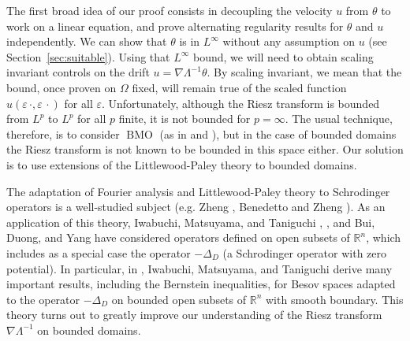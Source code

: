 \documentclass[11pt]{amsart}
\theoremstyle{remark}
\theoremstyle{definition}
\newcommand{\R}{\mathbb{R}}
\newcommand{\eps}{\varepsilon}
\DeclareMathOperator{\BMO}{BMO}
\newcommand{\grad}{\nabla}
\newcommand{\Laplace}{\Delta}
\begin{document}
\vskip0.3cm

The first broad  idea of our proof consists in decoupling the  velocity $u$ from  $\theta$ to work on  a linear equation, and prove alternating regularity results for $\theta$ and $u$ independently.  We can show that $\theta$ is in $L^\infty$ without any assumption on $u$ (see Section~\ref{sec:suitable}).  
Using that $L^\infty$ bound, we will need to obtain scaling invariant controls on the drift   $u = \grad \Lambda^{-1} \theta$.  By scaling invariant, we mean that the bound, once proven on $\Omega$ fixed, will remain true of the scaled function $u(\eps \, \cdot, \eps \, \cdot)$ for all $\eps$.  
Unfortunately, although the Riesz transform is bounded from $L^p$ to $L^p$ for all $p$ finite, it is not bounded for $p = \infty$.  
The usual technique, therefore, is to consider $\BMO$ (as in \cite{CaVa.sqg} and \cite{NoVa.qg}), but in the case of bounded domains the Riesz transform is not known to be bounded in this space either.  Our solution is to use extensions of the Littlewood-Paley theory to bounded domains. 

The adaptation of Fourier analysis and Littlewood-Paley theory to Schrodinger operators is a well-studied subject (e.g. Zheng \cite{Zh}, Benedetto and Zheng \cite{BeZh}).  As an application of this theory, Iwabuchi, Matsuyama, and Taniguchi \cite{IMT.besov}, \cite{IMT.schrodinger}, and Bui, Duong, and Yang \cite{BuDuYa} have considered operators defined on open subsets of $\R^n$, which includes as a special case the operator $-\Laplace_D$ (a Schrodinger operator with zero potential).  In particular, in \cite{IMT.bilinear},  Iwabuchi, Matsuyama, and Taniguchi derive many important results, including the Bernstein inequalities, for Besov spaces adapted to the operator $-\Laplace_D$ on bounded open subsets of $\R^n$ with smooth boundary.  This theory turns out to greatly improve our understanding of the Riesz transform $\grad \Lambda^{-1}$ on bounded domains.  
\end{document}
